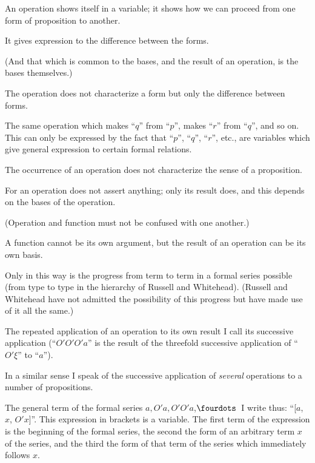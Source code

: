 {An operation shows itself in a variable; it shows
how we can proceed from one form of proposition
to another.

It gives expression to the difference between
the forms.

(And that which is common to the bases, and
the result of an operation, is the bases themselves.)}


{The operation does not characterize a form but
only the difference between forms.}


{The same operation which makes ``$q$'' from
``$p$'', makes ``$r$'' from ``$q$'', and so on. This
can only be expressed by the fact that ``$p$'', ``$q$'',
``$r$'', etc., are variables which give general expression
\enlargethispage{10pt} %
to certain formal relations.}


{The occurrence of an operation does not characterize
the sense of a proposition.

For an operation does not assert anything; only
its result does, and this depends on the bases of
the operation.

(Operation and function must not be confused
with one another.)}


{A function cannot be its own argument, but
the result of an operation can be its own
basis.}


{Only in this way is the progress from term
to term in a formal series possible (from type
to type in the hierarchy of Russell and Whitehead).
(Russell and Whitehead have not admitted
the possibility of this progress but have made use
of it all the same.)}


{The repeated application of an operation to
its own result I call its successive application
(``$O' O' O' a$'' is the result of the threefold successive
application of ``$O' \xi$'' to ``$a$'').

In a similar sense I speak of the successive
application of \emph{several} operations to a number of
propositions.}


{The general term of the formal series $a, O' a,
O' O' a$,\;$\fourdots$\ I write thus: ``[$a$, $x$, $O' x$]''. This
expression in brackets is a variable. The first
term of the expression is the beginning of the
formal series, the second the form of an arbitrary
term $x$ of the series, and the third the form
of that term of the series which immediately
follows $x$.}


